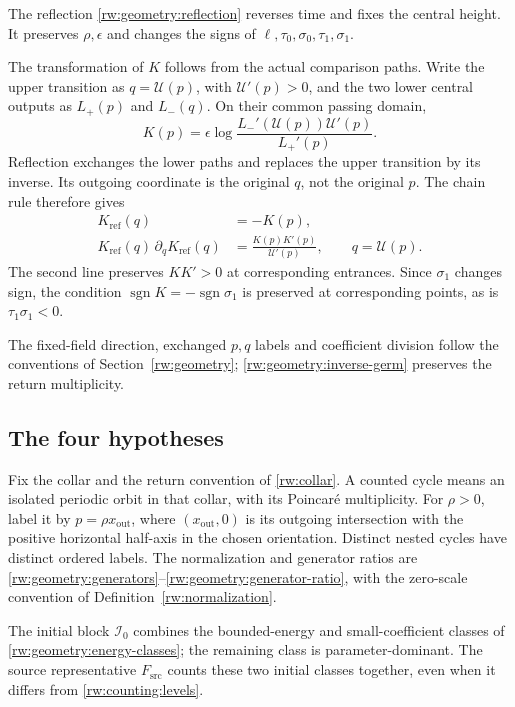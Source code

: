 The reflection \eqref{rw:geometry:reflection} reverses time and fixes
the central height. It preserves $\rho,\epsilon$ and changes the signs
of $\ell,\tau_0,\sigma_0,\tau_1,\sigma_1$.

The transformation of $K$ follows from the actual comparison paths.
Write the upper transition as $q=\mathcal U(p)$, with
$\mathcal U'(p)>0$, and the two lower central outputs as $L_+(p)$
and $L_-(q)$.  On their common passing domain,
\[
 K(p)=\epsilon\log
 \frac{L_-'(\mathcal U(p))\mathcal U'(p)}{L_+'(p)}.
\]
Reflection exchanges the lower paths and replaces the upper transition
by its inverse.  Its outgoing coordinate is the original $q$, not the
original $p$.  The chain rule therefore gives
\begin{equation}\label{rw:counting:reflection}
 \begin{split}
 K_{\mathrm{ref}}(q)&=-K(p),\\
 K_{\mathrm{ref}}(q)\,\partial_qK_{\mathrm{ref}}(q)
 &=\frac{K(p)K'(p)}{\mathcal U'(p)},
 \qquad q=\mathcal U(p).
 \end{split}
\end{equation}
The second line preserves $KK'>0$ at corresponding entrances.
Since $\sigma_1$ changes sign, the condition
$\operatorname{sgn}K=-\operatorname{sgn}\sigma_1$ is preserved at
corresponding points, as is $\tau_1\sigma_1<0$.

The fixed-field direction, exchanged $p,q$ labels and coefficient
division follow the conventions of Section~\ref{rw:geometry};
\eqref{rw:geometry:inverse-germ} preserves the return multiplicity.

\subsection{The four hypotheses}

Fix the collar and the return convention of \ref{rw:collar}.  A counted
cycle means an isolated periodic orbit in that collar, with its
Poincar\'e multiplicity.  For $\rho>0$, label it by
$p=\rho x_{\mathrm{out}}$, where $(x_{\mathrm{out}},0)$ is its outgoing
intersection with the positive horizontal half-axis in the chosen
orientation.  Distinct nested cycles have distinct ordered labels.
The normalization and generator ratios are
\eqref{rw:geometry:generators}--\eqref{rw:geometry:generator-ratio},
with the zero-scale convention of Definition~\ref{rw:normalization}.

The initial block $\mathcal I_0$ combines the bounded-energy and
small-coefficient classes of \eqref{rw:geometry:energy-classes};
the remaining class is parameter-dominant. The source representative
$F_{\mathrm{src}}$ counts these two initial classes together, even
when it differs from \eqref{rw:counting:levels}.

